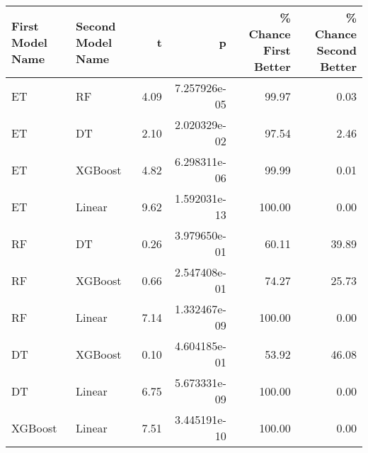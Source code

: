 \begin{tabular}{llrrrr}
\toprule
First Model Name & Second Model Name &    t &            p &  \% Chance First Better &  \% Chance Second Better \\
\midrule
              ET &                RF & 4.09 & 7.257926e-05 &                  99.97 &                    0.03 \\
              ET &                DT & 2.10 & 2.020329e-02 &                  97.54 &                    2.46 \\
              ET &           XGBoost & 4.82 & 6.298311e-06 &                  99.99 &                    0.01 \\
              ET &            Linear & 9.62 & 1.592031e-13 &                 100.00 &                    0.00 \\
              RF &                DT & 0.26 & 3.979650e-01 &                  60.11 &                   39.89 \\
              RF &           XGBoost & 0.66 & 2.547408e-01 &                  74.27 &                   25.73 \\
              RF &            Linear & 7.14 & 1.332467e-09 &                 100.00 &                    0.00 \\
              DT &           XGBoost & 0.10 & 4.604185e-01 &                  53.92 &                   46.08 \\
              DT &            Linear & 6.75 & 5.673331e-09 &                 100.00 &                    0.00 \\
         XGBoost &            Linear & 7.51 & 3.445191e-10 &                 100.00 &                    0.00 \\
\bottomrule
\end{tabular}
